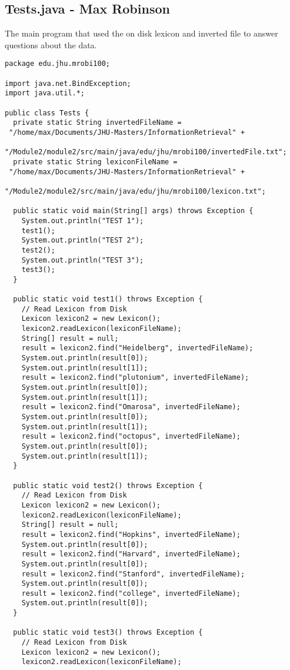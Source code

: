 \documentclass{article}
\begin{document}
\subsection{Tests.java - Max Robinson}
The main program that used the on disk lexicon and inverted file to answer questions about the data. 
\begin{verbatim}
package edu.jhu.mrobi100;

import java.net.BindException;
import java.util.*;

public class Tests {
  private static String invertedFileName =
 "/home/max/Documents/JHU-Masters/InformationRetrieval" +
          "/Module2/module2/src/main/java/edu/jhu/mrobi100/invertedFile.txt";
  private static String lexiconFileName =
 "/home/max/Documents/JHU-Masters/InformationRetrieval" +
          "/Module2/module2/src/main/java/edu/jhu/mrobi100/lexicon.txt";

  public static void main(String[] args) throws Exception {
    System.out.println("TEST 1");
    test1();
    System.out.println("TEST 2");
    test2();
    System.out.println("TEST 3");
    test3();
  }

  public static void test1() throws Exception {
    // Read Lexicon from Disk
    Lexicon lexicon2 = new Lexicon();
    lexicon2.readLexicon(lexiconFileName);
    String[] result = null;
    result = lexicon2.find("Heidelberg", invertedFileName);
    System.out.println(result[0]);
    System.out.println(result[1]);
    result = lexicon2.find("plutonium", invertedFileName);
    System.out.println(result[0]);
    System.out.println(result[1]);
    result = lexicon2.find("Omarosa", invertedFileName);
    System.out.println(result[0]);
    System.out.println(result[1]);
    result = lexicon2.find("octopus", invertedFileName);
    System.out.println(result[0]);
    System.out.println(result[1]);
  }

  public static void test2() throws Exception {
    // Read Lexicon from Disk
    Lexicon lexicon2 = new Lexicon();
    lexicon2.readLexicon(lexiconFileName);
    String[] result = null;
    result = lexicon2.find("Hopkins", invertedFileName);
    System.out.println(result[0]);
    result = lexicon2.find("Harvard", invertedFileName);
    System.out.println(result[0]);
    result = lexicon2.find("Stanford", invertedFileName);
    System.out.println(result[0]);
    result = lexicon2.find("college", invertedFileName);
    System.out.println(result[0]);
  }

  public static void test3() throws Exception {
    // Read Lexicon from Disk
    Lexicon lexicon2 = new Lexicon();
    lexicon2.readLexicon(lexiconFileName);


\end{verbatim}
\end{document}

